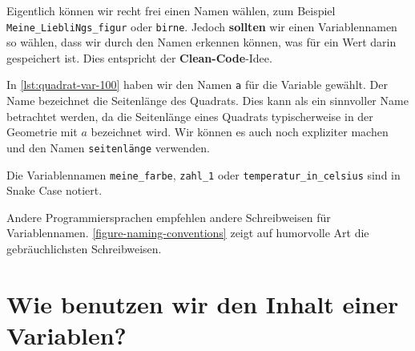 Eigentlich können wir recht frei einen Namen wählen, zum Beispiel \lstinline[language={python3}]{Meine_LiebliNgs_figur} oder \lstinline[language={python3}]{birne}. Jedoch \textbf{sollten} wir einen Variablennamen so wählen, dass wir durch den Namen erkennen können, was für ein Wert darin gespeichert ist. Dies entspricht der \textbf{Clean-Code}-Idee.


\begin{example}
In \autoref{lst:quadrat-var-100} haben wir den Namen \lstinline[language={python3}]{a} für die Variable gewählt. Der Name bezeichnet die Seitenlänge des Quadrats. Dies kann als ein sinnvoller Name betrachtet werden, da die Seitenlänge eines Quadrats typischerweise in der Geometrie mit $a$ bezeichnet wird. Wir können es auch noch expliziter machen und den Namen \lstinline[language={python3}]{seitenlänge} verwenden.
\end{example}


\begin{example}
Die Variablennamen \lstinline[language={python3}]{meine_farbe}, \lstinline[language={python3}]{zahl_1} oder \lstinline[language={python3}]{temperatur_in_celsius} sind in Snake Case notiert.
\end{example}

\begin{hinweis}
Andere Programmiersprachen empfehlen andere Schreibweisen für Variablennamen. \autoref{figure-naming-conventions} zeigt auf humorvolle Art die gebräuchlichsten Schreibweisen.
\end{hinweis}

\section{Wie benutzen wir den Inhalt einer Variablen?}
\label{sec:wie-benutzen-wir-den-inhalt-einer-variablen}

